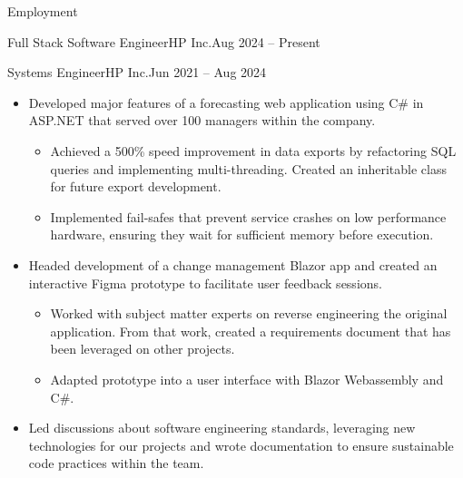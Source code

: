 \documentclass[]{mcdowellcv}
\begin{document}
\begin{cvsection}{Employment}
\begin{cvsubsection}{Full Stack Software Engineer}{HP Inc.}{Aug 2024 -- Present}
	   \end{cvsubsection}
    \vspace{-6pt}
     \begin{cvsubsection}{Systems Engineer}{HP Inc.}{Jun 2021 -- Aug 2024}
            \vspace{-4pt}
          \begin{itemize}%
              \item Developed major features of a forecasting web application using C\# in ASP.NET that served over 100 managers within the company.
                \begin{itemize}%
                    \item Achieved a 500\% speed improvement in data exports by refactoring SQL queries and implementing multi-threading. Created an inheritable class for future export development.
                    \item Implemented fail-safes that prevent service crashes on low performance hardware, ensuring they wait for sufficient memory before execution.      
                \end{itemize} 
            \end{itemize}
            \begin{itemize}%
            \item Headed development of a change management Blazor app and created an interactive Figma prototype to facilitate user feedback sessions.
                \begin{itemize}%
                    \item Worked with subject matter experts on reverse engineering the original application. From that work, created a requirements document that has been leveraged on other projects.
                    \item Adapted prototype into a user interface with Blazor Webassembly and C\#.
                \end{itemize} 
            \item Led discussions about software engineering standards, leveraging new technologies for our projects and wrote documentation to ensure sustainable code practices within the team.
            \end{itemize}    
    \end{cvsubsection}
        \end{cvsection}
        \vspace{-4pt}
\end{document}

